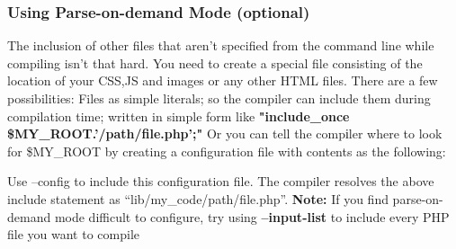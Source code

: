 \subsubsection{Using Parse-on-demand Mode (optional)}
The inclusion of other files that aren't specified from the command line while compiling isn't that hard. 
You need to create a special file consisting of the location of your CSS,JS and images or any other HTML files.
There are a few possibilities:
Files as simple literals; so the compiler can include them during compilation time; written in simple form like \textbf{"include\_once \$MY\_ROOT.'/path/file.php';"}
Or you can tell the compіler where to look for \$MY\_ROOT by creating a configuration file with contents as the following:

Use --config to include this configuration file. The compiler resolves the above include statement as ``lib/my\_code/path/file.php''.
\textbf{Note:} If you find parse-on-demand mode difficult to configure, try using \textbf{--input-list} to include every PHP file you want to compile

